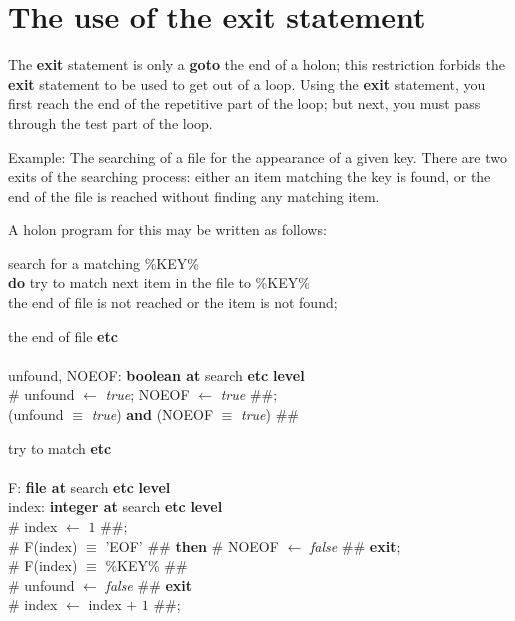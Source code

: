 \documentclass[openany,nobib]{tufte-book}
\newcommand{\kw}[1]{{\bf #1}}
\newcommand{\ind}[1]{\-\hspace{\dimexpr 2mm*#1\relax}}
\begin{document}
\section{The use of the exit statement}

The \kw{exit} statement is only a \kw{goto} the end of a holon; this
restriction forbids the \kw{exit} statement to be used to get out of a loop.
Using the \kw{exit} statement, you first reach the end of the repetitive part
of the loop; but next, you must pass through the test part of the loop.

Example: The searching of a file for the appearance of a given key. There are
two exits of the searching process: either an item matching the key is found,
or the end of the file is reached without finding any matching item.

A holon program for this may be written as follows:

\smallskip\noindent
search for a matching \%KEY\%\\
\ind{1}\kw{begin} \kw{do} try to match next item in the file to \%KEY\%\\
\ind{2}\kw{while} the end of file is not reached or the item is not found;\\
\ind{1}\kw{end}

\smallskip\noindent
the end of file \kw{etc} \\
\ind{1}\kw{begin} \\
\ind{2}\kw{declare} unfound, NOEOF: \kw{boolean at} search \kw{etc}
\kw{level}\\
\ind{2}\kw{initial} \# unfound $\gets$ {\it true}; NOEOF $\gets$ {\it true}
\#\#;\\
\ind{2}(unfound $\equiv$ {\it true}) \kw{and} (NOEOF $\equiv$ {\it true})
\#\#\\
\ind{1}\kw{end}

\smallskip\noindent
try to match \kw{etc} \\
\ind{1}\kw{begin} \\
\ind{2}\kw{declare} F: \kw{file at} search \kw{etc} \kw{level}\\
\ind{2}\kw{declare} index: \kw{integer at} search \kw{etc} \kw{level}\\
\ind{2}\kw{initial} \# index $\gets$ $1$ \#\#;\\
\ind{2}\kw{if} \# F(index) $\equiv$ 'EOF' \#\# \kw{then} \# NOEOF $\gets$ {\it
false}
\#\# \kw{exit};\\
\ind{2}\kw{if} \# F(index) $\equiv$ \%KEY\% \#\#\\
\ind{3}\kw{then} \# unfound $\gets$ {\sl false} \#\# \kw{exit}\\
\ind{3}\kw{else} \# index $\gets$ index $+$ $1$ \#\#;\\
\ind{1}\kw{end}
\end{document}
